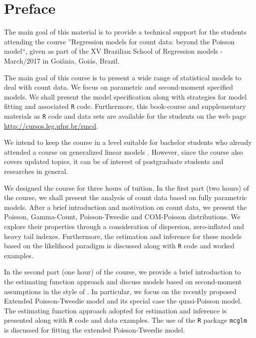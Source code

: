 \documentclass[9pt,a5paper,]{book}
\theoremstyle{definition}
\theoremstyle{definition}
\theoremstyle{remark}
\begin{document}
\clearpage
\thispagestyle{empty}
\pagebreak

\setcounter{page}{1}

{
\setcounter{tocdepth}{1}
\tableofcontents
}
\chapter*{Preface}\label{preface}

The main goal of this material is to provide a technical support for the
students attending the course ''Regression models for count data: beyond
the Poisson model``, given as part of the XV Brazilian School of
Regression models - March/2017 in Goiânia, Goiás, Brazil.

The main goal of this course is to present a wide range of statistical
models to deal with count data. We focus on parametric and second-moment
specified models. We shall present the model specification along with
strategies for model fitting and associated \texttt{R}\citep{R2015}
code. Furthermore, this book-course and supplementary materials as
\texttt{R} code and data sets are available for the students on the web
page \url{http://cursos.leg.ufpr.br/rmcd}.

We intend to keep the course in a level suitable for bachelor students
who already attended a course on generalized linear models
\citep{Nelder1972}. However, since the course also covers updated
topics, it can be of interest of postgraduate students and researches in
general.

We designed the course for three hours of tuition. In the first part
(two hours) of the course, we shall present the analysis of count data
based on fully parametric models. After a brief introduction and
motivation on count data, we present the Poisson, Gamma-Count,
Poisson-Tweedie and COM-Poisson distributions. We explore their
properties through a consideration of dispersion, zero-inflated and
heavy tail indexes. Furthermore, the estimation and inference for these
models based on the likelihood paradigm is discussed along with
\texttt{R} code and worked examples.

In the second part (one hour) of the course, we provide a brief
introduction to the estimating function approach \citetext{\citealp[
]{Jorgensen2004}; \citealp{Bonat2016a}} and discuss models based on
second-moment assumptions in the style of \citet{Wedderburn1974}. In
particular, we focus on the recently proposed Extended Poisson-Tweedie
model \citep{Bonat2016b} and its special case the quasi-Poisson model.
The estimating function approach adopted for estimation and inference is
presented along with \texttt{R} code and data examples. The use of the
\texttt{R} package \texttt{mcglm} \citep{Bonat2016c} is discussed for
fitting the extended Poisson-Tweedie model.
\end{document}
